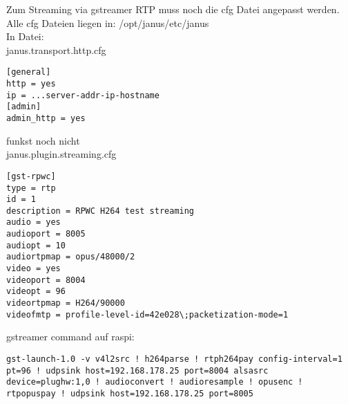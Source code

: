 Zum Streaming via gstreamer RTP muss noch die cfg Datei angepasst werden.\\
Alle cfg Dateien liegen in: /opt/janus/etc/janus\\

In Datei:\\
janus.transport.http.cfg
\begin{verbatim}
[general]
http = yes
ip = ...server-addr-ip-hostname
[admin]
admin_http = yes
\end{verbatim}

funkst noch nicht\\
janus.plugin.streaming.cfg
\begin{verbatim}
[gst-rpwc]
type = rtp 
id = 1 
description = RPWC H264 test streaming 
audio = yes 
audioport = 8005 
audiopt = 10 
audiortpmap = opus/48000/2 
video = yes 
videoport = 8004 
videopt = 96 
videortpmap = H264/90000 
videofmtp = profile-level-id=42e028\;packetization-mode=1 
\end{verbatim}

gstreamer command auf raspi:
\begin{verbatim}
gst-launch-1.0 -v v4l2src ! h264parse ! rtph264pay config-interval=1 pt=96 ! udpsink host=192.168.178.25 port=8004 alsasrc device=plughw:1,0 ! audioconvert ! audioresample ! opusenc ! rtpopuspay ! udpsink host=192.168.178.25 port=8005
\end{verbatim}

